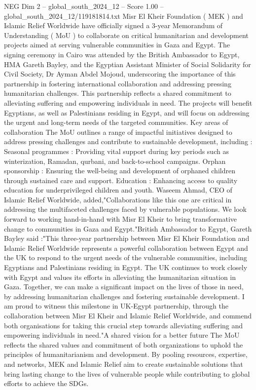 \begin{textsample}{NEG Dim 2 – global\_south\_2024\_12 – Score 1.00 – global\_south\_2024\_12/119181814.txt}  \label{ex:f2_neg_238}
Misr El Kheir Foundation ( MEK ) and Islamic Relief Worldwide have officially signed a 3-year Memorandum of Understanding ( MoU ) to collaborate on critical humanitarian and development projects aimed at serving vulnerable communities in Gaza and Egypt.
The signing ceremony in Cairo was attended by the British Ambassador to Egypt, HMA Gareth Bayley, and the Egyptian Assistant Minister of Social Solidarity for Civil Society, Dr Ayman Abdel Mojoud, underscoring the importance of this partnership in fostering international collaboration and addressing pressing humanitarian challenges.
This partnership reflects a shared commitment to alleviating suffering and empowering individuals in need.
The projects will benefit Egyptians, as well as Palestinians residing in Egypt, and will focus on addressing the urgent and long-term needs of the targeted communities.
Key areas of collaboration The MoU outlines a range of impactful initiatives designed to address pressing challenges and contribute to sustainable development, including : Seasonal programmes : Providing vital support during key periods such as winterization, Ramadan, qurbani, and back-to-school campaigns.
Orphan sponsorship : Ensuring the well-being and development of orphaned children through sustained care and support.
Education : Enhancing access to quality education for underprivileged children and youth.
Waseem Ahmad, CEO of Islamic Relief Worldwide, added,"Collaborations like this one are critical in addressing the multifaceted challenges faced by vulnerable populations.
We look forward to working hand-in-hand with Misr El Kheir to bring transformative change to communities in Gaza and Egypt."British Ambassador to Egypt, Gareth Bayley said :"This three-year partnership between Misr El Kheir Foundation and Islamic Relief Worldwide represents a powerful collaboration between Egypt and the UK to respond to the urgent needs of the vulnerable communities, including Egyptians and Palestinians residing in Egypt.
The UK continues to work closely with Egypt and values its efforts in alleviating the humanitarian situation in Gaza.
Together, we can make a significant impact on the lives of those in need, by addressing humanitarian challenges and fostering sustainable development.
I am proud to witness this milestone in UK-Egypt partnership, through the collaboration between Misr El Kheir and Islamic Relief Worldwide, and commend both organisations for taking this crucial step towards alleviating suffering and empowering individuals in need."A shared vision for a better future The MoU reflects the shared values and commitment of both organizations to uphold the principles of humanitarianism and development.
By pooling resources, expertise, and networks, MEK and Islamic Relief aim to create sustainable solutions that bring lasting change to the lives of vulnerable people while contributing to global efforts to achieve the SDGs.

\end{textsample}
